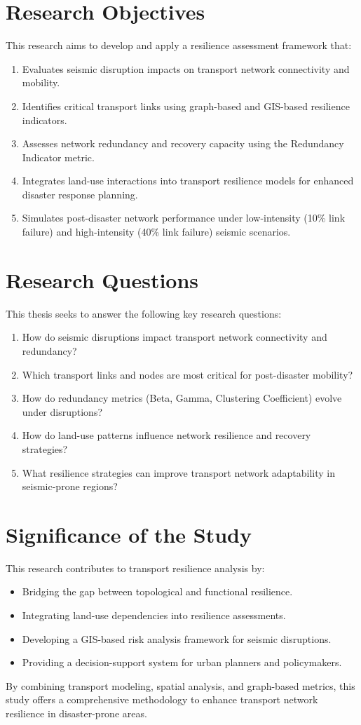 \section{Research Objectives}
This research aims to develop and apply a resilience assessment framework that:
\begin{enumerate}
    \item Evaluates seismic disruption impacts on transport network connectivity and mobility.
    \item Identifies critical transport links using graph-based and GIS-based resilience indicators.
    \item Assesses network redundancy and recovery capacity using the Redundancy Indicator metric.
    \item Integrates land-use interactions into transport resilience models for enhanced disaster response planning.
    \item Simulates post-disaster network performance under low-intensity (10\% link failure) and high-intensity (40\% link failure) seismic scenarios.
\end{enumerate}

\section{Research Questions}
This thesis seeks to answer the following key research questions:
\begin{enumerate}
    \item How do seismic disruptions impact transport network connectivity and redundancy?
    \item Which transport links and nodes are most critical for post-disaster mobility?
    \item How do redundancy metrics (Beta, Gamma, Clustering Coefficient) evolve under disruptions?
    \item How do land-use patterns influence network resilience and recovery strategies?
    \item What resilience strategies can improve transport network adaptability in seismic-prone regions?
\end{enumerate}

\section{Significance of the Study}
This research contributes to transport resilience analysis by:
\begin{itemize}
    \item Bridging the gap between topological and functional resilience.
    \item Integrating land-use dependencies into resilience assessments.
    \item Developing a GIS-based risk analysis framework for seismic disruptions.
    \item Providing a decision-support system for urban planners and policymakers.
\end{itemize}
By combining transport modeling, spatial analysis, and graph-based metrics, this study offers a comprehensive methodology to enhance transport network resilience in disaster-prone areas.



